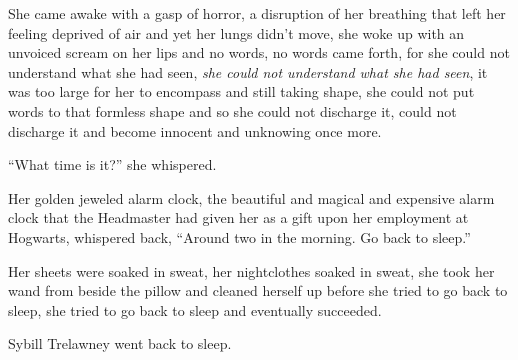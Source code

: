 She came awake with a gasp of horror, a disruption of her breathing that
left her feeling deprived of air and yet her lungs didn't move, she woke
up with an unvoiced scream on her lips and no words, no words came
forth, for she could not understand what she had seen, \emph{she could
not understand what she had seen}, it was too large for her to encompass
and still taking shape, she could not put words to that formless shape
and so she could not discharge it, could not discharge it and become
innocent and unknowing once more.

``What time is it?'' she whispered.

Her golden jeweled alarm clock, the beautiful and magical and expensive
alarm clock that the Headmaster had given her as a gift upon her
employment at Hogwarts, whispered back, ``Around two in the morning. Go
back to sleep.''

Her sheets were soaked in sweat, her nightclothes soaked in sweat, she
took her wand from beside the pillow and cleaned herself up before she
tried to go back to sleep, she tried to go back to sleep and eventually
succeeded.

Sybill Trelawney went back to sleep.
